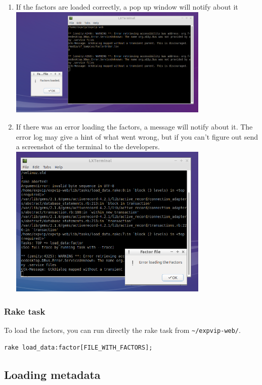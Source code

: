 \begin{enumerate}
\item
  If the factors are loaded correctly, a pop up window will notify about
  it \\ \includegraphics[width=0.75\textwidth]{expVIP/tutorial/images/LoadFactors04.png}
\item
  If there was an error loading the factors, a message will notify about
  it. The error log may give a hint of what went wrong, but if you can't
  figure out send a screenshot of the terminal to the developers.
  \\ \includegraphics[width=0.75\textwidth]{expVIP/tutorial/images/LoadFactors05.png}
\end{enumerate}

\subsubsection{Rake task}\label{rake-task}

To load the factors, you can run directly the rake task from
\lstinline!~/expvip-web/!.

\begin{lstlisting}
rake load_data:factor[FILE_WITH_FACTORS]; 
\end{lstlisting}

\subsection{Loading metadata}\label{loading-metadata}


